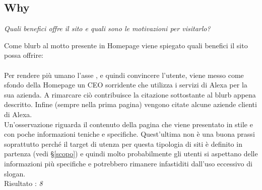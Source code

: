 \subsection{Why}\label{why}
\begin{center}

\textit{Quali benefici offre il sito e quali sono le motivazioni per visitarlo?}

\end{center}
\begin{flushleft}
Come blurb al motto presente in Homepage viene spiegato quali benefici il sito 
possa offrire: \\
\\
Per rendere più umano l'asse , e quindi convincere l'utente,
viene messo come sfondo della Homepage un CEO sorridente che utilizza i servizi di Alexa
per la sua azienda. A rimarcare ciò contribuisce la citazione sottostante al 
blurb appena descritto. Infine (sempre nella prima pagina)
vengono citate alcune aziende clienti di Alexa. \\
Un'osservazione riguarda il contenuto della pagina
che viene presentato in stile  e con poche informazioni
teniche e specifiche. Quest'ultima non è una buona prassi soprattutto perch\'e il target di utenza
per questa tipologia di siti è definito in partenza (vedi §\ref{scopo}) e quindi
molto probabilmente gli utenti si aspettano delle informazioni più specifiche 
e potrebbero rimanere infastiditi dall'uso eccessivo di slogan. \\
Risultato : \textit{8}

\end{flushleft}
